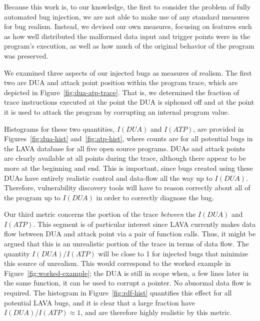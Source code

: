 Because this work is, to our knowledge, the first to consider the problem of fully automated bug injection, we are not able to make use of any standard measures for bug realism.
Instead, we devised our own measures, focusing on features such as how well distributed the malformed data input and trigger points were in the program's execution, as well as how much of the original behavior of the program was preserved.

We examined three aspects of our injected bugs as measures of realism. 
The first two are DUA and attack point position within the program trace, which are depicted in Figure~\ref{fig:dua-atp-trace}.
That is, we determined the fraction of trace instructions executed at the point the DUA is siphoned off and at the point it is used to attack the program by corrupting an internal program value.

Histograms for these two quantities, $I(DUA)$ and $I(ATP)$, are provided in Figures~\ref{fig:dua-hist} and~\ref{fig:atp-hist}, where counts are for all potential bugs in the LAVA database for all five open source programs. 
DUAs and attack points are clearly available at all points during the trace, although there appear to be more at the beginning and end.
This is important, since bugs created using these DUAs have entirely realistic control and data-flow all the way up to $I(DUA)$.
Therefore, vulnerability discovery tools will have to reason correctly about all of the program up to $I(DUA)$ in order to correctly diagnose the bug.

Our third metric concerns the portion of the trace \emph{between} the $I(DUA)$ and $I(ATP)$.
This segment is of particular interest since LAVA currently makes data flow between DUA and attack point via a pair of function calls.
Thus, it might be argued that this is an unrealistic portion of the trace in terms of data flow.
The quantity $I(DUA)/I(ATP)$ will be close to 1 for injected bugs that minimize this source of unrealism.
This would correspond to the worked example in Figure~\ref{fig:worked-example}; the DUA is still in scope when, a few lines later in the same function, it can be used to corrupt a pointer.
No abnormal data flow is required.
The histogram in Figure~\ref{fig:rdf-hist} quantifies this effect for all potential LAVA bugs, and it is clear that a large fraction have $I(DUA)/I(ATP) \approx 1$, and are therefore highly realistic by this metric.

